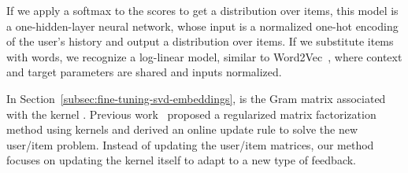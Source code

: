 \documentclass[sigconf]{acmart}
\begin{document}
If we apply a softmax to the scores to get a distribution over items, this model is a one-hidden-layer neural network, whose input is a normalized one-hot encoding of the user's history and output a distribution over items. If we substitute items with words, we recognize a log-linear model, similar to Word2Vec~\cite{NIPS2013_5021}, where context and target parameters are shared and inputs normalized.

In Section~\ref{subsec:fine-tuning-svd-embeddings},  is the Gram matrix associated with the kernel . Previous work~\cite{kernel-mf} proposed a regularized matrix factorization method using kernels and derived an online update rule to solve the new user/item problem. Instead of updating the user/item matrices, our method focuses on updating the kernel itself to adapt to a new type of feedback.
\end{document}
